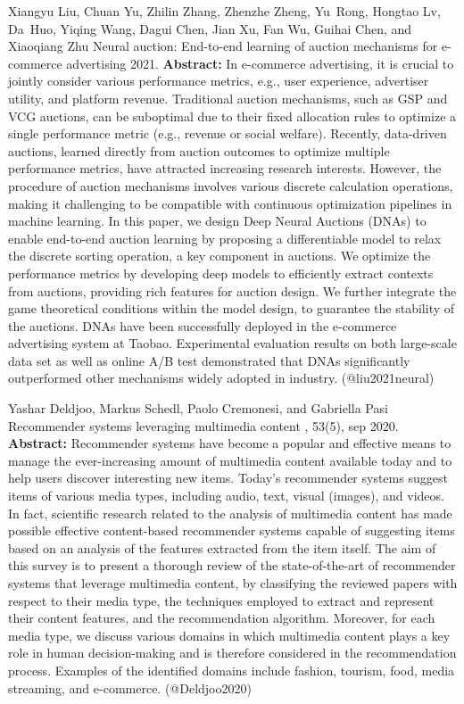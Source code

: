 \documentclass{article}
\begin{document}
\begin{thebibliography}{}
 Xiangyu Liu, Chuan Yu, Zhilin Zhang, Zhenzhe Zheng, Yu~Rong, Hongtao Lv, Da~Huo, Yiqing Wang, Dagui Chen, Jian Xu, Fan Wu, Guihai Chen, and Xiaoqiang Zhu \newblock Neural auction: End-to-end learning of auction mechanisms for e-commerce advertising 2021. \newblock \textbf{Abstract:} In e-commerce advertising, it is crucial to jointly consider various performance metrics, e.g., user experience, advertiser utility, and platform revenue. Traditional auction mechanisms, such as GSP and VCG auctions, can be suboptimal due to their fixed allocation rules to optimize a single performance metric (e.g., revenue or social welfare). Recently, data-driven auctions, learned directly from auction outcomes to optimize multiple performance metrics, have attracted increasing research interests. However, the procedure of auction mechanisms involves various discrete calculation operations, making it challenging to be compatible with continuous optimization pipelines in machine learning. In this paper, we design Deep Neural Auctions (DNAs) to enable end-to-end auction learning by proposing a differentiable model to relax the discrete sorting operation, a key component in auctions. We optimize the performance metrics by developing deep models to efficiently extract contexts from auctions, providing rich features for auction design. We further integrate the game theoretical conditions within the model design, to guarantee the stability of the auctions. DNAs have been successfully deployed in the e-commerce advertising system at Taobao. Experimental evaluation results on both large-scale data set as well as online A/B test demonstrated that DNAs significantly outperformed other mechanisms widely adopted in industry. \newblock (@liu2021neural)

 Yashar Deldjoo, Markus Schedl, Paolo Cremonesi, and Gabriella Pasi \newblock Recommender systems leveraging multimedia content , 53(5), sep 2020. \newblock \textbf{Abstract:} Recommender systems have become a popular and effective means to manage the ever-increasing amount of multimedia content available today and to help users discover interesting new items. Today’s recommender systems suggest items of various media types, including audio, text, visual (images), and videos. In fact, scientific research related to the analysis of multimedia content has made possible effective content-based recommender systems capable of suggesting items based on an analysis of the features extracted from the item itself. The aim of this survey is to present a thorough review of the state-of-the-art of recommender systems that leverage multimedia content, by classifying the reviewed papers with respect to their media type, the techniques employed to extract and represent their content features, and the recommendation algorithm. Moreover, for each media type, we discuss various domains in which multimedia content plays a key role in human decision-making and is therefore considered in the recommendation process. Examples of the identified domains include fashion, tourism, food, media streaming, and e-commerce. \newblock (@Deldjoo2020)


\end{thebibliography}
\end{document}
